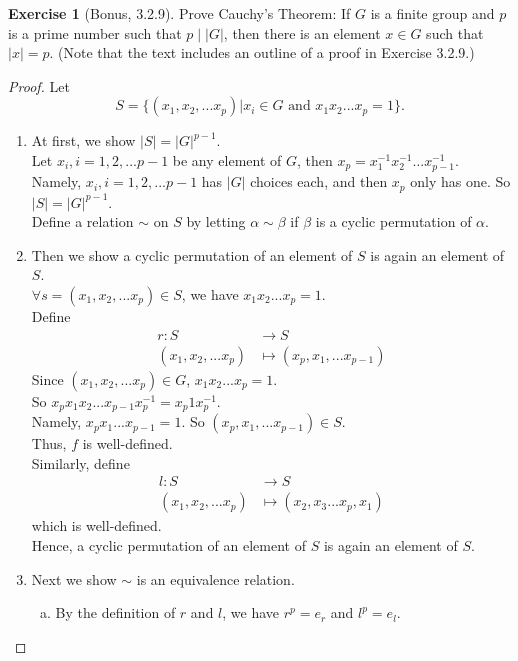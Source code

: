 \documentclass[14pt]{amsart}
\theoremstyle{plain}
\theoremstyle{definition}
\newtheorem{exer}[lem]{Exercise}
\begin{document}
\begin{exer}[Bonus, 3.2.9]
Prove Cauchy's Theorem: If $G$ is a finite group and $p$ is a prime number such that $p\mid |G|$, then there is an element $x\in G$ such that $|x|=p$.
(Note that the text includes an outline of a proof in Exercise 3.2.9.)
\end{exer}
\begin{proof}
	Let
	\[S=\{ (x_1,x_2,...x_p)| x_i \in G \text{ and } x_1x_2...x_p =1\}.\]
	\begin{enumerate}
	  \item
		At first, we show $|S|= |G|^{p-1}$.\\
 	    Let $x_i, i = 1,2,...p-1$ be any element of $G$, then $x_p = x_1^{-1}x_2^{-1}...x_{p-1}^{-1}$. \\
		Namely, $x_i,i = 1,2,...p-1$ has $|G|$ choices each, and then $x_p$ only has one. So $|S| = |G|^{p-1}$.	\\
		Define a relation $\sim $ on $S$ by letting $\alpha \sim \beta$ if $\beta$ is a cyclic permutation of $\alpha$.
	  \item
	  Then we show a cyclic permutation of an element of $S$ is again an element of $S$.\\
  	$\forall s = (x_1,x_2,...x_p) \in S$, we have $x_1x_2...x_p = 1$.\\
	Define 
	\begin{align*}
		r: S &\to S	\\
		(x_1,x_2,...x_p) &\mapsto (x_p,x_1,...x_{p-1})	
	\end{align*}
	Since $(x_1,x_2,...x_p) \in G$, $x_1x_2...x_p =1$.\\
	So $x_px_1x_2...x_{p-1}x_p^{-1} = x_p1 x_p^{-1}$.\\
	Namely, $x_px_1...x_{p-1} =1$. So $(x_p,x_1,...x_{p-1}) \in S$.\\
	Thus, $f$ is well-defined.\\
	Similarly, define
	\begin{align*}
		l: S &\to S	\\
		(x_1,x_2,...x_p) &\mapsto (x_2,x_3...x_{p},x_1)	
	\end{align*}
	which is well-defined.\\
	Hence, a cyclic permutation of an element of $S$ is again an element of $S$.
	  \item
		Next we show $\sim $ is an equivalence relation.\\
		\begin{enumerate}[(a)]
		\item
		By the definition of $r$ and $l$, we have $r^p = e_r$ and $l^p =e_l$. \\

\end{enumerate}
\end{enumerate}
\end{proof}
\end{document}
